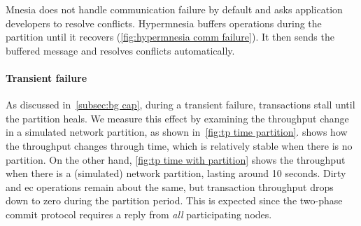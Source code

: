 Mnesia does not handle communication failure by default and asks
application developers to resolve conflicts. Hypermnesia buffers operations during
the partition until it recovers (\cref{fig:hypermnesia comm failure}). It then
sends the buffered message and resolves conflicts automatically.

\paragraph{Transient failure} \label{para:eval transient failure}

As discussed in~\cref{subsec:bg cap}, during a transient failure,
transactions stall until the partition heals. We measure this effect by
examining the throughput change in a simulated network partition, as shown
in~\cref{fig:tp time partition}.  shows how the 
throughput changes through time, which is
relatively stable when there is no partition. On the other 
hand, \cref{fig:tp time with partition}
shows the throughput when there is a (simulated) network partition, lasting around
10 seconds. Dirty and \acrshort{ec} operations remain about the same, but transaction
throughput drops down to zero during the partition period. This is expected since
the two-phase commit protocol requires a reply from \emph{all} participating nodes.

